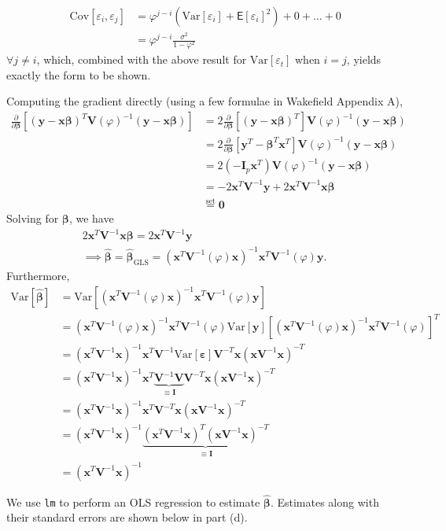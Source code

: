 \documentclass[11pt]{article}
\newcommand*\pd{\partial}
\newcommand*\ba{\[ \begin{aligned}}
\newcommand*\ea{\end{aligned} \]}
\newcommand*\eps{\epsilon}
\newcommand*\E[1]{\mathsf{E}\left[#1\right]}
\newcommand*\Var[1]{\text{Var}\left[#1\right]}
\newcommand*\Cov[1]{\;\text{Cov}\left[#1\right]}
\newcommand*\estim[1]{\widehat{#1}}
\newcommand*\pderiv[2]{\frac{\pd #1}{\pd #2}}
\newcommand*\bI{\mathbf{I}}
\newcommand*\bV{\mathbf{V}}
\newcommand*\bx{\mathbf{x}}
\newcommand*\by{\mathbf{y}}
\newcommand*\bzero{\mathbf{0}}
\newcommand*\bbeta{\boldsymbol{\beta}}
\newcommand*\beps{\boldsymbol{\varepsilon}}
\renewcommand\;{\,}
\renewcommand\epsilon{\varepsilon}
\renewcommand\phi{\varphi}
\begin{document}
\ba
\Cov{\eps_i, \eps_j}
	& = \phi^{j-i} \left(\Var{\eps_i} + \E{\eps_i}^2\right) + 0 + \dotsc + 0 \\
	& = \phi^{j-i} \frac{\sigma^2}{1 - \phi^2}
\ea
$\forall j \ne i$, which, combined with the above result for $\Var{\eps_t}$ when $i = j$, yields exactly the form to be shown. 
\item
Computing the gradient directly (using a few formulae in Wakefield Appendix A),
\ba
\pderiv{}{\bbeta} \left[ (\by - \bx \bbeta)^T \bV(\phi)^{-1} (\by - \bx \bbeta) 
	\right]
	& = 2 \pderiv{}{\bbeta} \left[ (\by - \bx \bbeta)^T \right]
		\bV(\phi)^{-1} (\by - \bx \bbeta) \\
	& = 2 \pderiv{}{\bbeta} \left[ \by^T - \bbeta^T \bx^T \right]
		\bV(\phi)^{-1} (\by - \bx \bbeta) \\
	& = 2 \left( - \bI_p \bx^T \right) 
		\bV(\phi)^{-1} (\by - \bx \bbeta) \\
	& = -2 \bx^T \bV^{-1} \by + 2 \bx^T \bV^{-1} \bx \bbeta \\
	& \overset{\text{set}}{=} \bzero
\ea
Solving for $\bbeta$, we have
\ba
2 \bx^T \bV^{-1} \bx \bbeta = 2 \bx^T \bV^{-1} \by  \\
	\implies \boxed{ \estim\bbeta = \estim{\bbeta}_{\text{GLS}} =
		(\bx^T \bV^{-1}(\phi) \bx)^{-1} \bx^T \bV^{-1}(\phi) \by }.
\ea
Furthermore,
\ba
\Var{\estim{\bbeta}} & = 
	\Var{ (\bx^T \bV^{-1}(\phi) \bx)^{-1} \bx^T \bV^{-1}(\phi) \by } \\
	& = (\bx^T \bV^{-1}(\phi) \bx)^{-1} \bx^T \bV^{-1}(\phi) \Var{\by} 
		\left[ (\bx^T \bV^{-1}(\phi) \bx)^{-1} \bx^T \bV^{-1}(\phi) \right]^T \\
	& = (\bx^T \bV^{-1} \bx)^{-1} \bx^T \bV^{-1} \Var{\beps}
		\bV^{-T} \bx (\bx \bV^{-1} \bx)^{-T} \\
	& = (\bx^T \bV^{-1} \bx)^{-1} \bx^T \underbrace{\bV^{-1} \bV}_{\equiv \bI}
		 \bV^{-T} \bx (\bx \bV^{-1} \bx)^{-T} \\
	& = (\bx^T \bV^{-1} \bx)^{-1} \bx^T \bV^{-T}  
		 \bx (\bx \bV^{-1} \bx)^{-T} \\
	& = (\bx^T \bV^{-1} \bx)^{-1} 
		\underbrace{\left(\bx^T \bV^{-1} \bx\right)^T  
		 (\bx \bV^{-1} \bx)^{-T}}_{\equiv \bI} \\
	& = \left(\bx^T \bV^{-1} \bx\right)^{-1}
\ea
\item
We use \texttt{lm} to perform an OLS regression to estimate $\estim{\bbeta}$. Estimates along with their standard errors are shown below in part (d).
\end{document}
